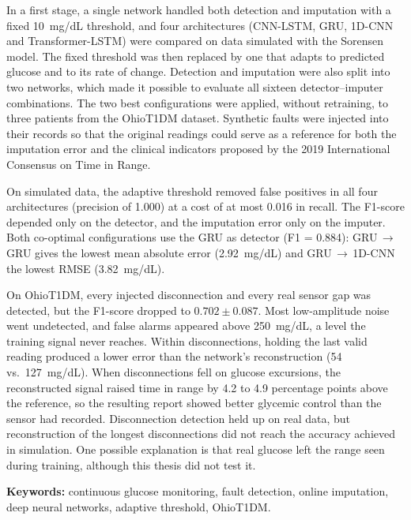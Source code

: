 \documentclass{report}
\begin{document}
In a first stage, a single network handled both detection and imputation with a fixed 10~mg/dL threshold, and four architectures (CNN-LSTM, GRU, 1D-CNN and Transformer-LSTM) were compared on data simulated with the Sorensen model. %
The fixed threshold was then replaced by one that adapts to predicted glucose and to its rate of change. Detection and imputation were also split into two networks, which made it possible to evaluate all sixteen detector--imputer combinations. The two best configurations were applied, without retraining, to three patients from the OhioT1DM dataset. Synthetic faults were injected into their records so that the original readings could serve as a reference for both the imputation error and the clinical indicators proposed by the 2019 International Consensus on Time in Range.

On simulated data, the adaptive threshold removed false positives in all four architectures (precision of 1.000) at a cost of at most 0.016 in recall. The F1-score depended only on the detector, and the imputation error only on the imputer. Both co-optimal configurations use the GRU as detector (F1 = 0.884): GRU\,$\rightarrow$\,GRU gives the lowest mean absolute error (2.92~mg/dL) and GRU\,$\rightarrow$\,1D-CNN the lowest RMSE (3.82~mg/dL).

On OhioT1DM, every injected disconnection and every real sensor gap was detected, but the F1-score dropped to $0.702 \pm 0.087$. Most low-amplitude noise went undetected, and false alarms appeared above 250~mg/dL, a level the training signal never reaches. Within disconnections, holding the last valid reading produced a lower error than the network's reconstruction (54 vs.\ 127~mg/dL). When disconnections fell on glucose excursions, the reconstructed signal raised time in range by 4.2 to 4.9 percentage points above the reference, so the resulting report showed better glycemic control than the sensor had recorded. Disconnection detection held up on real data, but reconstruction of the longest disconnections did not reach the accuracy achieved in simulation. One possible explanation is that real glucose left the range seen during training, although this thesis did not test it.

\vspace{0.5cm}
\noindent\textbf{Keywords:} continuous glucose monitoring, fault detection, online imputation, deep neural networks, adaptive threshold, OhioT1DM.

\tableofcontents
\cleardoublepage
\end{document}
